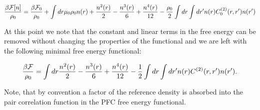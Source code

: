 \begin{equation}
    \frac{\beta\mathcal{F}[n]}{\rho_0} = \frac{\beta\mathcal{F}_0}{\rho_0} +
    \int dr \mu_0 \rho_0 n(r) + \frac{n^2(r)}{2} - \frac{n^3(r)}{6} + \frac{n^4(r)}{12}
    -\frac{\rho_0}{2} \int dr \int dr^\prime n(r) C^{(2)}_0(r, r^\prime) n(r^\prime)
\end{equation}

At this point we note that the constant and linear terms in the free energy can be removed without changing the properties of the functional and we are left with the following minimal free energy functional:

\begin{equation}
    \frac{\beta\mathcal{F}}{\rho_0} = \int dr \frac{n^2(r)}{2} - \frac{n^3(r)}{6} + \frac{n^4(r)}{12}
    -\frac{1}{2} \int dr \int dr^\prime n(r) C^{(2)}(r, r^\prime) n(r^\prime).
\end{equation}

Note, that by convention a factor of the reference density is absorbed into the pair correlation function in the PFC free energy functional.
